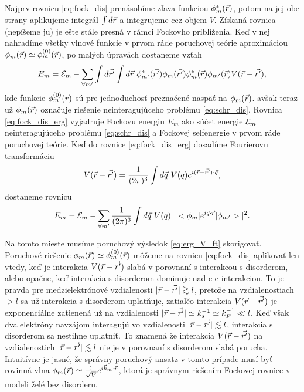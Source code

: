 Najprv rovnicu \eqref{eq:fock_dis} prenásobíme zľava funkciou $\phi^*_{m}(\vec{r})$, potom na jej obe strany aplikujeme integrál $\int d \vec{r}$ a integrujeme cez objem $V$.
Získaná rovnica (nepíšeme ju) je ešte stále presná v rámci Fockovho priblíženia. Keď v nej nahradíme všetky vlnové funkcie v prvom ráde poruchovej teórie aproximáciou
$\phi_m(\vec{r}) \simeq \phi_m^{(0)}(\vec{r})$, po malých úpravách dostaneme vzťah
\begin{equation}
 \label{eq:fock_dis_erg}
 E_m=\E_m-\sum_{\forall m'} \int d\vrp \int d\vr\ \phi^*_{m'}(\vrp) \phi_{m}(\vrp)\phi^*_{m}(\vr)\phi_{m'}(\vr)V(\vr-\vrp) \text{,}
\end{equation}
  kde funkcie
$\phi_m^{(0)}(\vec{r})$ sú pre jednoduchosť preznačené naspäť na $\phi_m(\vec{r})$.
avšak teraz už $\phi_m(\vec{r})$ označuje riešenie neinteragujúceho problému \eqref{eq:schr_dis}.
 Rovnica \eqref{eq:fock_dis_erg}
  vyjadruje Fockovu energiu $E_m$ ako súčet energie $\mathcal{E}_m$ neinteragujúceho problému \eqref{eq:schr_dis}
 a Fockovej selfenergie v prvom ráde poruchovej teórie.
Keď do rovnice \eqref{eq:fock_dis_erg} dosadíme Fourierovu transformáciu
\begin{equation}
 \label{eq:V_ft}
 V(\vr-\vrp)=\ftkvec{(\vr-\vrp)}{\vq}{V(q)}\text{,}
\end{equation}
dostaneme rovnicu
\begin{equation}
\label{eq:erg_V_ft}
 E_m=\E_m-\sum_{\forall m'}\frac{1}{(2\pi)^{3}} \int d\vq\ V(q) \ |\bra{\phi_m}e^{i\vq\cdot\vr}\ket{\phi_{m'}}|^2 \text{.}
\end{equation}

Na tomto mieste musíme poruchový výsledok \eqref{eq:erg_V_ft} skorigovať. Poruchové riešenie
$\phi_m(\vec{r}) \simeq \phi_m^{(0)}(\vec{r})$ môžeme na rovnicu  \eqref{eq:fock_dis} aplikovať len vtedy,
keď je interakcia $V(\vec{r}-\vec{r'})$ slabá v porovnaní s interakcou s disorderom, alebo opačne, keď interakcia s disorderom dominuje nad e-e interakciou.
To je pravda pre medzielektrónové vzdialenosti $|\vec{r}-\vec{r'}| \gtrsim l$, pretože na vzdialenostiach $>l$ sa už interakcia s disorderom uplatňuje,
zatiaľčo interakcia $V(\vec{r}-\vec{r'})$ je exponenciálne zatienená už na vzdialenosti $|\vec{r}-\vec{r'}| \simeq k_s^{-1} \simeq k_F^{-1} \ll l$.
Keď však dva elektróny navzájom interagujú vo vzdialenosti $|\vec{r}-\vec{r'}| \lesssim l$, interakcia s disorderom sa nestihne uplatniť.
To znamená že interakcia $V(\vec{r}-\vec{r'})$ na vzdialenostich $|\vec{r}-\vec{r'}| \lesssim l$ nie je v porovnaní s disorderom slabá porucha.
Intuitívne je jasné, že správny poruchový ansatz v tomto prípade musí byť rovinná vlna
$\phi_m(\vec{r}) \simeq \frac{1}{\sqrt V}e^{i\vec{k}_m\cdot\vec{r}}$, ktorá je správnym riešením Fockovej rovnice v modeli želé bez disorderu.

